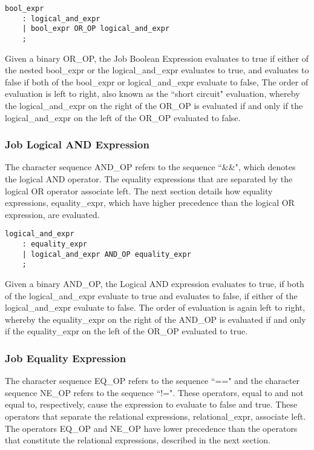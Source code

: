 \documentclass[prodmode,acmtecs]{acmsmall}
\begin{document}
\begin{lstlisting}
bool_expr
	: logical_and_expr
	| bool_expr OR_OP logical_and_expr
	;
\end{lstlisting}

Given a binary OR\_OP, the Job Boolean Expression evaluates to true 
if either of the nested bool\_expr or the logical\_and\_expr evaluates
to true, and evaluates to false if both of the bool\_expr or
logical\_and\_expr evaluate to false, The order of evaluation is left
to right, also known as the ``short circuit" evaluation, whereby
the logical\_and\_expr on the right of the OR\_OP is evaluated if
and only if the logical\_and\_expr on the left of the OR\_OP 
evaluated to false. 
\medskip

\subsubsection{Job Logical AND Expression}

The character sequence AND\_OP refers to the sequence ``\&\&", which 
denotes the logical AND operator. The equality expressions that are 
separated by the logical OR operator associate left. The next section 
details how equality expressions, equality\_expr, which have higher 
precedence than the logical OR expression, are evaluated. 

\begin{lstlisting}
logical_and_expr
	: equality_expr
	| logical_and_expr AND_OP equality_expr
	;
\end{lstlisting}

Given a binary AND\_OP, the Logical AND expression evaluates to true,
if both of the logical\_and\_expr evaluate to true and evaluates to false,
if either of the logical\_and\_expr evaluate to false. 
The order of evaluation is again left to right, whereby the 
equality\_expr on the right of the AND\_OP is evaluated if and only 
if the equality\_expr on the left of the OR\_OP evaluated to true.
\medskip

\subsubsection{Job Equality Expression}

The character sequence EQ\_OP refers to the sequence ``==" and the 
character sequence NE\_OP refers to the sequence ``!=". These operators, 
equal to and not equal to, respectively, cause the expression to 
evaluate to false and true.  These operators that separate the
relational expressions, relational\_expr, associate left. The
operators EQ\_OP and NE\_OP have lower precedence than the 
operators that constitute the relational expressions, described in the 
next section. 
\end{document}
